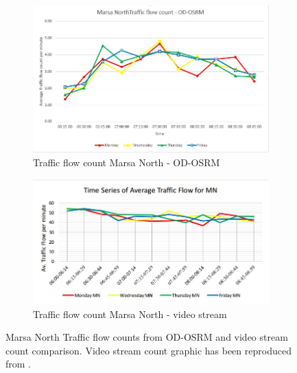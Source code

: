 \documentclass[12pt, a4paper]{report}
\theoremstyle{definition}
\theoremstyle{definition}%
\theoremstyle{definition}%
\theoremstyle{definition}%
\theoremstyle{definition}%
\theoremstyle{definition}%
\begin{document}
\begin{figure}[!] 
	\centering
	\begin{subfigure}{0.7\textwidth}
		\centering
		\includegraphics[width=\linewidth]{traffic_flow_count_MN_MINE.jpg} 
		\caption{\scriptsize{Traffic flow count Marsa North - OD-OSRM}} 
		\label{fig:traffic_flow_count_MN_MINE}
	\end{subfigure}
	
	\vspace{1cm}
	\begin{subfigure}{0.7\textwidth}
		\centering
		\includegraphics[width=\linewidth]{traffic_flow_count_MN_Nigel_pace.jpg} 
		\caption{\scriptsize{Traffic flow count Marsa North - video stream}}
		\label{fig:traffic_flow_count_MN_NP}
	\end{subfigure}
	\caption[Linear chart for Kappara northbound and southbound traffic flow]{Marsa North Traffic flow counts from OD-OSRM and video stream count comparison. Video stream count graphic has been reproduced from \cite{Pace2017}.}
	\label{fig:marsa_north_traffic_flow_line_chart}
\end{figure}
\end{document}
